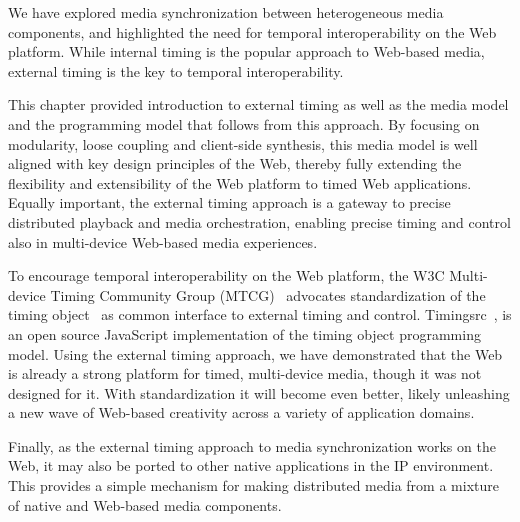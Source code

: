 We have explored media synchronization between heterogeneous media components,
and highlighted the need for temporal interoperability on the Web platform.
While internal timing is the popular approach to Web-based media, external
timing is the key to temporal interoperability.

This chapter provided introduction to external timing as well as the media
model and the programming model that follows from this approach. By focusing
on modularity, loose coupling and client-side synthesis, this media model is
well aligned with key design principles of the Web, thereby fully extending
the flexibility and extensibility of the Web platform to timed Web
applications. Equally important, the external timing approach is a gateway to
precise distributed playback and media orchestration, enabling precise timing
and control also in multi-device Web-based media experiences.

To encourage temporal interoperability on the Web platform, the W3C Multi-
device Timing Community Group (MTCG)~\cite{mtcg} advocates standardization of
the timing object~\cite{timingobject} as common interface to external timing
and control. Timingsrc~\cite{timingsrc}, is an open source JavaScript
implementation of the timing object programming model. Using the external
timing approach, we have demonstrated that the Web is already a strong
platform for timed, multi-device media, though it was not designed for it.
With standardization it will become even better, likely unleashing a new wave
of Web-based creativity across a variety of application domains.

Finally, as the external timing approach to media synchronization works on the
Web, it may also be ported to other native applications in the IP environment.
This provides a simple mechanism for making distributed media from a mixture
of native and Web-based media components.
